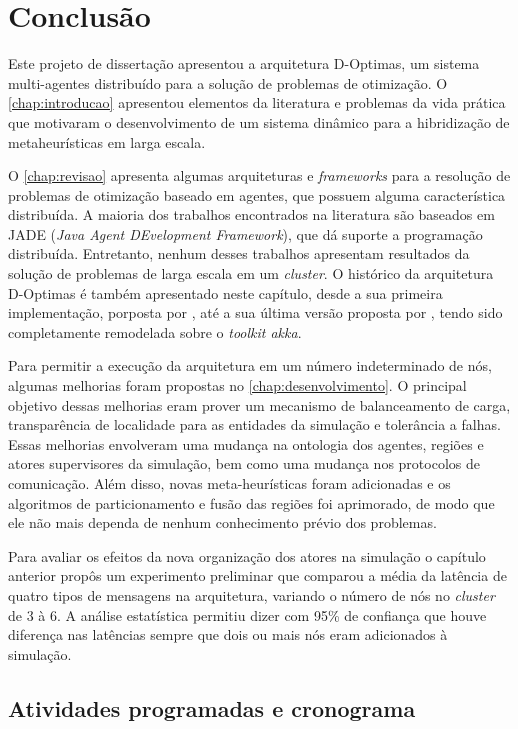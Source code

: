 \chapter{Conclusão}
\label{chap:conclusao}

Este projeto de dissertação apresentou  a arquitetura D-Optimas, um sistema multi-agentes distribuído para a solução de problemas de otimização. O \autoref{chap:introducao} apresentou elementos da literatura e problemas da vida prática que motivaram o desenvolvimento de um sistema dinâmico para a hibridização de metaheurísticas em larga escala. 

O \autoref{chap:revisao} apresenta algumas arquiteturas e \textit{frameworks} para a resolução de problemas de otimização baseado em agentes, que possuem alguma característica distribuída. A maioria dos trabalhos encontrados na literatura são baseados em JADE (\textit{Java Agent DEvelopment Framework}), que dá suporte a programação distribuída. Entretanto, nenhum desses trabalhos apresentam resultados da solução de problemas de larga escala em um \textit{cluster}. O histórico da arquitetura D-Optimas é também apresentado neste capítulo, desde a sua primeira implementação, porposta por , até a sua última versão proposta por , tendo sido completamente remodelada sobre o \textit{toolkit akka}.

Para permitir a execução da arquitetura em um número indeterminado de nós, algumas melhorias foram propostas no \autoref{chap:desenvolvimento}. O principal objetivo dessas melhorias eram prover um mecanismo de balanceamento de carga, transparência de localidade para as entidades da simulação e tolerância a falhas. Essas melhorias envolveram uma mudança na ontologia dos agentes, regiões e atores supervisores da simulação, bem como uma mudança nos protocolos de comunicação. Além disso, novas meta-heurísticas foram adicionadas e os algoritmos de particionamento e fusão das regiões foi aprimorado, de modo que ele não mais dependa de nenhum conhecimento prévio dos problemas.

Para avaliar os efeitos da nova organização dos atores na simulação o capítulo anterior propôs um experimento preliminar que comparou a média da latência de quatro tipos de mensagens na arquitetura, variando o número de nós no \textit{cluster}  de 3 à 6. A análise estatística permitiu dizer com 95\% de confiança que houve diferença nas latências sempre que dois ou mais nós eram adicionados à simulação. 

\section{Atividades programadas e cronograma}

